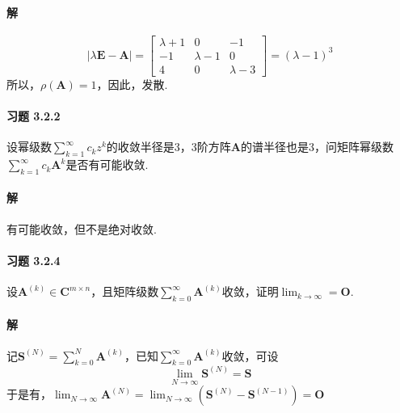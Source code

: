 \documentclass[12pt, a4paper, oneside, fontset=none]{ctexart}
\begin{document}
\paragraph*{解}
\[
    |\lambda \bm{E} - \bm{A}| = \begin{bmatrix}
        \lambda + 1 & 0           & -1          \\
        -1          & \lambda - 1 & 0           \\
        4           & 0           & \lambda - 3
    \end{bmatrix} = (\lambda - 1)^3
\]
所以，$\rho(\bm{A}) = 1$，因此，发散.

\paragraph*{习题 3.2.2} 设幂级数$\sum_{k=1}^\infty c_kz^k$的收敛半径是3，3阶方阵$\bm{A}$的谱半径也是3，问矩阵幂级数$\sum_{k = 1}^\infty c_k \bm{A}^k$是否有可能收敛.

\paragraph*{解} 有可能收敛，但不是绝对收敛.

\paragraph*{习题 3.2.4} 设$\bm{A}^{(k)} \in \bm{C}^{m \times n}$，且矩阵级数$\sum_{k=0}^\infty \bm{A}^{(k)}$收敛，证明$\lim_{k\to \infty} = \bm{O}$.

\paragraph*{解} 记$\bm{S}^{(N)} = \sum_{k=0}^N \bm{A}^{(k)}$，已知$\sum_{k=0}^\infty \bm{A}^{(k)}$收敛，可设
\[
    \lim_{N \to \infty} \bm{S}^{(N)} = \bm{S}
\]
于是有，$\lim_{N\to \infty} \bm{A}^{(N)} = \lim_{N\to \infty} (\bm{S}^{(N)} - \bm{S}^{(N - 1)}) = \bm{O}$
\end{document}
